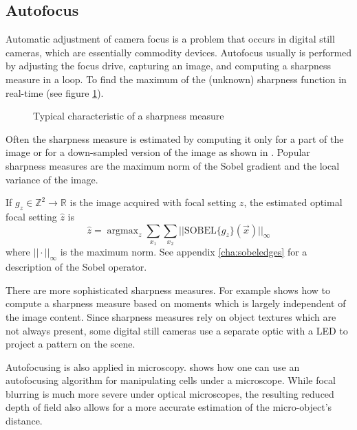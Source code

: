 \documentclass[a4paper,12pt]{book}
\begin{document}
\subsection{Autofocus}
Automatic adjustment of camera focus is a problem that occurs in digital still
cameras, which are essentially commodity devices. Autofocus usually is
performed by adjusting the focus drive, capturing an image, and computing a
sharpness measure in a loop. To find the maximum of the (unknown) sharpness
function in real-time (see figure \ref{fig:autofocus}).
\begin{figure}[htbp]
   \begin{center}
     \caption{Typical characteristic of a sharpness
       measure\label{fig:autofocus}}
   \end{center}
\end{figure}
Often the sharpness measure is estimated by computing it only for a part of
the image or for a down-sampled version of the image
as shown in \cite{RefWorks:435}. Popular sharpness measures are the
maximum norm of the Sobel gradient and the local variance of the image.

If $g_z\in\mathbb{Z}^2\to\mathbb{R}$ is the image acquired with focal setting
$z$, the estimated optimal focal setting $\widehat{z}$ is
\begin{equation*}
  \widehat{z}=\displaystyle\mathop{\mathrm{argmax}}_{z}
  \sum_{x_1}\sum_{x_2} ||\mathrm{SOBEL}\{g_z\}(\vec{x})||_{\infty}
\end{equation*}
where $||\cdot||_{\infty}$ is the maximum norm. See appendix
\ref{cha:sobeledges} for a description of the Sobel operator.

There are more sophisticated sharpness measures. For example
\cite{RefWorks:436} shows how to compute a sharpness measure based on
moments which is largely independent of the image content. Since
sharpness measures rely on object textures which are not always present,
some digital still cameras use a separate optic with a LED to project a
pattern on the scene.

Autofocusing is also applied in microscopy. \cite{RefWorks:42} shows how
one can use an autofocusing algorithm for manipulating cells under a
microscope. While focal blurring is much more severe under optical microscopes,
the resulting reduced depth of field also allows for a more accurate
estimation of the micro-object's distance.
\end{document}
